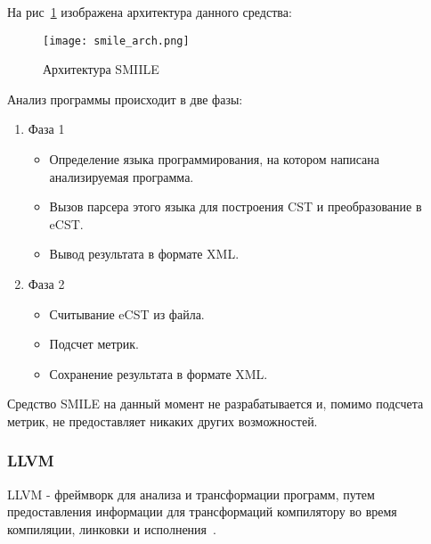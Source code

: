 На рис~\ref{fig:smile_arch} изображена архитектура данного средства:

\begin{figure}[h!]
    \begin{center}
        \texttt{[image: smile\_arch.png]}
    \end{center}
    \caption{Архитектура SMIILE}
    \label{fig:smile_arch}
\end{figure}

Анализ программы происходит в две фазы:

\begin{enumerate}
    \item Фаза 1
    \begin{itemize}
        \item Определение языка программирования, на котором написана
        анализируемая программа.
        \item Вызов парсера этого языка для построения CST и преобразование в
        eCST.
        \item Вывод результата в формате XML.
    \end{itemize}

    \item Фаза 2
    \begin{itemize}
        \item Считывание eCST из файла.
        \item Подсчет метрик.
        \item Сохранение результата в формате XML.
    \end{itemize}
\end{enumerate}

Средство SMILE на данный момент не разрабатывается и, помимо подсчета метрик, не
предоставляет никаких других возможностей.

\subsubsection{LLVM}


LLVM - фреймворк для анализа и трансформации программ, путем предоставления
информации для трансформаций компилятору во время компиляции, линковки и
исполнения~\cite{llvm}.

